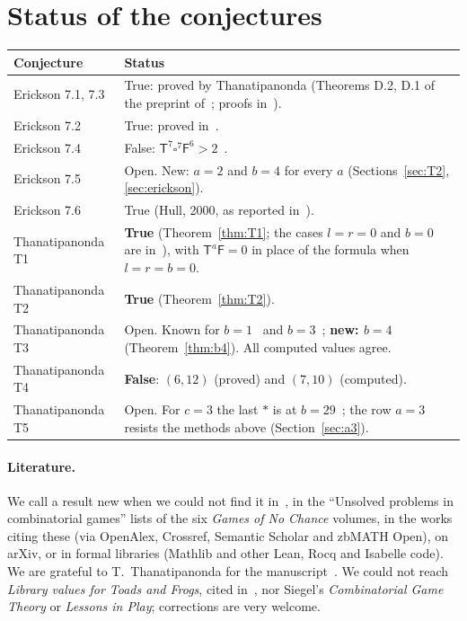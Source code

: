 \documentclass[11pt,a4paper]{article}
\newcommand{\Tt}{\mathsf{T}}
\newcommand{\Ff}{\mathsf{F}}
\newcommand{\E}{\square}
\theoremstyle{plain}
\theoremstyle{remark}
\begin{document}
\section{Status of the conjectures}

\begin{center}
\renewcommand{\arraystretch}{1.25}
\begin{tabularx}{\linewidth}{@{}l>{\raggedright\arraybackslash}X@{}}
\toprule
Conjecture & Status \\
\midrule
Erickson 7.1, 7.3 & True: proved by Thanatipanonda (Theorems D.2, D.1 of the preprint
  of~\cite{T11}; proofs in~\cite{Th08,T11b}). \\
Erickson 7.2 & True: proved in~\cite{TZ07}. \\
Erickson 7.4 & False: $\Tt^7\E^7\Ff^6>2$~\cite{T11}. \\
Erickson 7.5 & Open. New: $a=2$ and $b=4$ for every $a$ (Sections~\ref{sec:T2},
  \ref{sec:erickson}). \\
Erickson 7.6 & True (Hull, 2000, as reported in~\cite{T11}). \\
Thanatipanonda T1 & \textbf{True} (Theorem~\ref{thm:T1}; the cases $l=r=0$ and $b=0$ are
  in~\cite{E96}), with $\Tt^a\Ff=0$ in place of the
  formula when $l=r=b=0$. \\
Thanatipanonda T2 & \textbf{True} (Theorem~\ref{thm:T2}). \\
Thanatipanonda T3 & Open. Known for $b=1$~\cite{WW} and $b=3$~\cite{Th08};
  \textbf{new: $b=4$} (Theorem~\ref{thm:b4}). All computed values agree. \\
Thanatipanonda T4 & \textbf{False}: $(6,12)$ (proved) and $(7,10)$ (computed). \\
Thanatipanonda T5 & Open. For $c=3$ the last $\ast$ is at $b=29$~\cite{T11}; the row $a=3$
  resists the methods above (Section~\ref{sec:a3}). \\
\bottomrule
\end{tabularx}
\end{center}

\paragraph{Literature.} We call a result new when we could not find it in~\cite{E96,TZ07,T11,Th08},
in the ``Unsolved problems in combinatorial games'' lists of the six \emph{Games of No Chance}
volumes, in the works citing these (via OpenAlex, Crossref, Semantic Scholar and zbMATH Open), on
arXiv, or in formal libraries (Mathlib and other Lean, Rocq and Isabelle code). We are grateful to
T.~Thanatipanonda for the manuscript~\cite{T11b}. We could not reach \emph{Library
values for Toads and Frogs}, cited in~\cite{T11,T11b}, nor Siegel's \emph{Combinatorial Game Theory} or
\emph{Lessons in Play}; corrections are very welcome.
\end{document}
